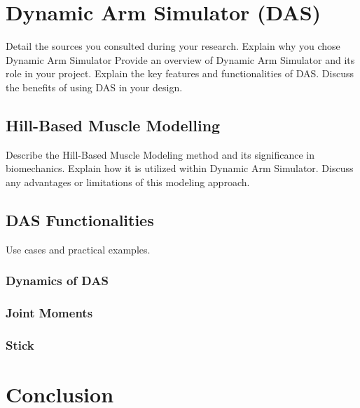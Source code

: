 \section{Dynamic Arm Simulator (DAS)}
Detail the sources you consulted during your research.
Explain why you chose Dynamic Arm Simulator
Provide an overview of Dynamic Arm Simulator and its role in your project.
Explain the key features and functionalities of DAS.
Discuss the benefits of using DAS in your design.


\subsection{Hill-Based Muscle Modelling}
Describe the Hill-Based Muscle Modeling method and its significance in biomechanics.
Explain how it is utilized within Dynamic Arm Simulator.
Discuss any advantages or limitations of this modeling approach.

\subsection{DAS Functionalities}



Use cases and practical examples.

\subsubsection{Dynamics of DAS}
\subsubsection{Joint Moments}
\subsubsection{Stick}

\section{Conclusion}